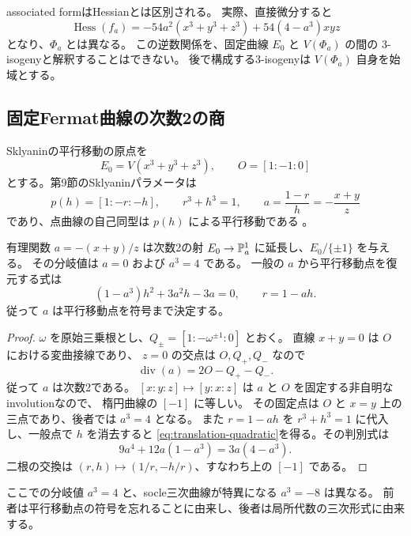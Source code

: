 associated formはHessianとは区別される\cite[Remark 3.1]{AIK}。
実際、直接微分すると
\begin{equation}\label{eq:fat-hessian-distinction}
 \operatorname{Hess}(f_a)
 =-54a^2(x^3+y^3+z^3)+54(4-a^3)xyz
\end{equation}
となり、$\Phi_a$ とは異なる。
この逆数関係を、固定曲線 $E_0$ と $V(\Phi_a)$ の間の
3-isogenyと解釈することはできない。
後で構成する3-isogenyは $V(\Phi_a)$ 自身を始域とする。

\subsection{固定Fermat曲線の次数2の商}

Sklyaninの平行移動の原点を
\[
 E_0=V(x^3+y^3+z^3),\qquad O=[1:-1:0]
\]
とする。第9節のSklyaninパラメータは
\[
 p(h)=[1:-r:-h],\qquad r^3+h^3=1,
 \qquad a=\frac{1-r}{h}=-\frac{x+y}{z}
\]
であり、点曲線の自己同型は $p(h)$ による平行移動である
\cite[Section 2.3]{WWY}。

\begin{theorem}[markedな係数からの復元]\label{thm:translation-double-cover}
有理関数 $a=-(x+y)/z$ は次数2の射
$E_0\to\mathbb P^1_a$ に延長し、$E_0/\{\pm1\}$ を与える。
その分岐値は $a=0$ および $a^3=4$ である。
一般の $a$ から平行移動点を復元する式は
\begin{equation}\label{eq:translation-quadratic}
 (1-a^3)h^2+3a^2h-3a=0,\qquad r=1-ah.
\end{equation}
従って $a$ は平行移動点を符号まで決定する。
\end{theorem}

\begin{proof}
$\omega$ を原始三乗根とし、$Q_\pm=[1:-\omega^{\pm1}:0]$ とおく。
直線 $x+y=0$ は $O$ における変曲接線であり、
$z=0$ の交点は $O,Q_+,Q_-$ なので
\[
 \operatorname{div}(a)=2O-Q_+-Q_-.
\]
従って $a$ は次数2である。
$[x:y:z]\mapsto[y:x:z]$ は $a$ と $O$ を固定する非自明なinvolutionなので、
楕円曲線の $[-1]$ に等しい。
その固定点は $O$ と $x=y$ 上の三点であり、後者では $a^3=4$ となる。
また $r=1-ah$ を $r^3+h^3=1$ に代入し、一般点で $h$ を消去すると
\eqref{eq:translation-quadratic}を得る。その判別式は
\[
 9a^4+12a(1-a^3)=3a(4-a^3).
\]
二根の交換は $(r,h)\mapsto(1/r,-h/r)$、すなわち上の $[-1]$ である。
\end{proof}

ここでの分岐値 $a^3=4$ と、socle三次曲線が特異になる $a^3=-8$ は異なる。
前者は平行移動点の符号を忘れることに由来し、後者は局所代数の三次形式に由来する。

